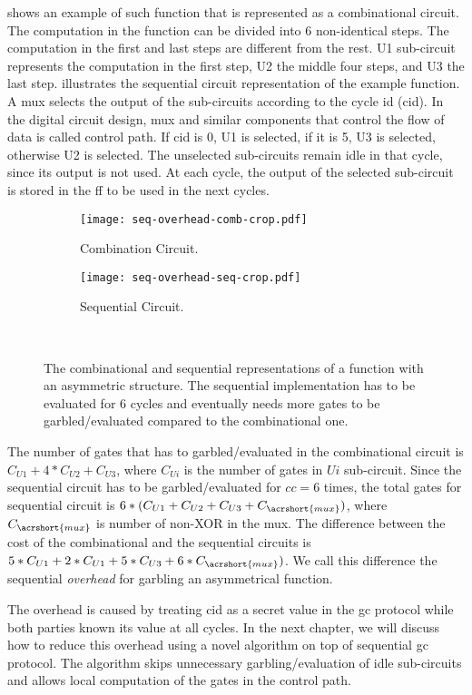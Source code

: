  shows an example of such function that is represented as a combinational circuit.
The computation in the function can be divided into 6 non-identical steps.
The computation in the first and last steps are different from the rest.
U1 sub-circuit represents the computation in the first step, U2 the middle four steps, and U3 the last step.
 illustrates the sequential circuit representation of the example function.
A \acrshort{mux} selects the output of the sub-circuits according to the cycle id (cid).
In the digital circuit design, \acrshort{mux} and similar components that control the flow of data is called control path.
If cid is 0, U1 is selected, if it is 5, U3 is selected, otherwise U2 is selected.
The unselected sub-circuits remain idle in that cycle, since its output is not used.
At each cycle, the output of the selected sub-circuit is stored in the \acrshort{ff} to be used in the next cycles.

\begin{figure}
    \centering
    \begin{subfigure}[t]{0.7\textwidth}
        \texttt{[image: seq-overhead-comb-crop.pdf]}
        \caption{Combination Circuit.}\label{fig:seq-overhead-comb}
    \end{subfigure}
    \begin{subfigure}[t]{0.6\textwidth}
        \texttt{[image: seq-overhead-seq-crop.pdf]}
        \caption{Sequential Circuit.}\label{fig:seq-overhead-seq}
    \end{subfigure}\\
    \caption{The combinational and sequential representations of a function with an asymmetric structure.
    The sequential implementation has to be evaluated for 6 cycles and eventually needs more gates to be garbled/evaluated compared to the combinational one.}\label{fig:fig:seq-overhead-comb}
\end{figure}

The number of gates that has to garbled/evaluated in the combinational circuit is $C_{U1}+4*C_{U2}+C_{U3}$, where $C_{Ui}$ is the number of gates in $Ui$ sub-circuit.
Since the sequential circuit has to be garbled/evaluated for $cc=6$ times, the total gates for sequential circuit is $6*(C_{U1}+C_{U2}+C_{U3}+C_{\acrshort{mux}})$, where $C_{\acrshort{mux}}$ is number of non-XOR in the \acrshort{mux}.
The difference between the cost of the combinational and the sequential circuits is $5*C_{U1}+2*C_{U1}+5*C_{U3}+6*C_{\acrshort{mux}})$.
We call this difference the sequential \textit{overhead} for garbling an asymmetrical function.

The overhead is caused by treating cid as a secret value in the \acrshort{gc} protocol while both parties known its value at all cycles.
In the next chapter, we will discuss how to reduce this overhead using a novel algorithm on top of sequential \acrshort{gc} protocol.
The algorithm skips unnecessary garbling/evaluation of idle sub-circuits and allows local computation of the gates in the control path.
